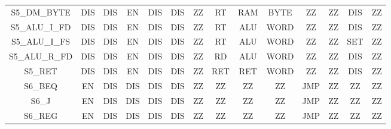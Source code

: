 \documentclass[main.tex]{subfiles}
\begin{document}
{\begin{tabular}[]{cccccccccccccc}
    S5\_DM\_BYTE  & DIS  & DIS  & EN  & DIS  & DIS & ZZ  & RT  & RAM & BYTE  & ZZ  & ZZ  & DIS  & ZZ \\
    S5\_ALU\_I\_FD  & DIS  & DIS  & EN  & DIS  & DIS & ZZ  & RT  & ALU & WORD  & ZZ  & ZZ  & DIS  & ZZ \\
    S5\_ALU\_I\_FS  & DIS  & DIS  & EN  & DIS  & DIS & ZZ  & RT  & ALU & WORD  & ZZ  & ZZ  & SET  & ZZ \\
    S5\_ALU\_R\_FD  & DIS  & DIS  & EN  & DIS  & DIS & ZZ  & RD  & ALU & WORD  & ZZ  & ZZ  & DIS  & ZZ \\
    S5\_RET  & DIS  & DIS  & EN  & DIS  & DIS & ZZ  & RET  & RET & WORD  & ZZ  & ZZ  & DIS  & ZZ \\
    S6\_BEQ  & EN  & DIS  & DIS  & DIS  & DIS & ZZ  & ZZ  & ZZ & ZZ  & JMP  & ZZ  & ZZ  & ZZ \\
    S6\_J  & EN  & DIS  & DIS  & DIS  & DIS & ZZ  & ZZ  & ZZ & ZZ  & JMP  & ZZ  & ZZ  & ZZ \\
    S6\_REG  & EN  & DIS  & DIS  & DIS  & DIS & ZZ  & ZZ  & ZZ & ZZ  & JMP  & ZZ  & ZZ  & ZZ \\
    \bottomrule
\end{tabular}
}%

\clearpage
\end{document}
